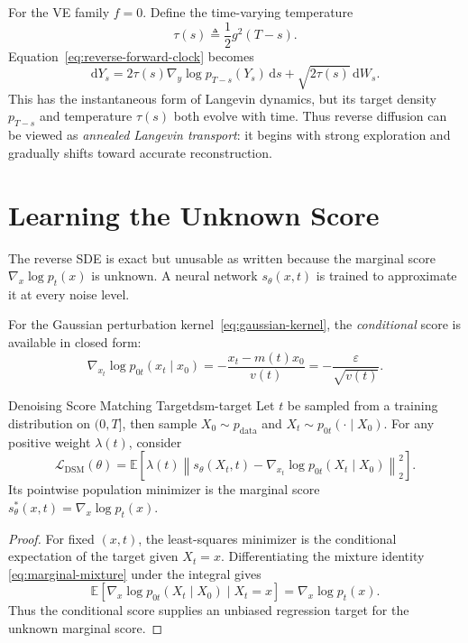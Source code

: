 \documentclass[11pt,a4paper]{article}
\renewcommand{\d}{\mathrm{d}}
\newcommand{\E}{\mathbb{E}}
\newcommand{\pdata}{p_{\mathrm{data}}}
\begin{document}
For the VE family $f=0$.  Define the time-varying temperature
\[
  \tau(s)\triangleq\frac12g^2(T-s).
\]
Equation~\eqref{eq:reverse-forward-clock} becomes
\begin{equation}\label{eq:annealed-langevin}
  \d Y_s
  =2\tau(s)\nabla_y\log p_{T-s}(Y_s)\,\d s
   +\sqrt{2\tau(s)}\,\d W_s.
\end{equation}
This has the instantaneous form of Langevin dynamics, but its target density
$p_{T-s}$ and temperature $\tau(s)$ both evolve with time.  Thus reverse
diffusion can be viewed as \emph{annealed Langevin transport}: it begins with
strong exploration and gradually shifts toward accurate reconstruction.

\section{Learning the Unknown Score}\label{sec:score}

The reverse SDE is exact but unusable as written because the marginal score
$\nabla_x\log p_t(x)$ is unknown.  A neural network $s_\theta(x,t)$ is trained
to approximate it at every noise level.

For the Gaussian perturbation kernel~\eqref{eq:gaussian-kernel}, the
\emph{conditional} score is available in closed form:
\begin{equation}\label{eq:conditional-score}
  \nabla_{x_t}\log p_{0t}(x_t\mid x_0)
  =-\frac{x_t-m(t)x_0}{v(t)}
  =-\frac{\varepsilon}{\sqrt{v(t)}}.
\end{equation}

\begin{proposition}{Denoising Score Matching Target}{dsm-target}
Let $t$ be sampled from a training distribution on $(0,T]$, then sample
$X_0\sim\pdata$ and $X_t\sim p_{0t}(\cdot\mid X_0)$.  For any positive weight
$\lambda(t)$, consider
\begin{equation}\label{eq:dsm-loss}
  \mathcal{L}_{\mathrm{DSM}}(\theta)
  =\E\!\left[
    \lambda(t)
    \left\|
      s_\theta(X_t,t)
      -\nabla_{x_t}\log p_{0t}(X_t\mid X_0)
    \right\|_2^2
  \right].
\end{equation}
Its pointwise population minimizer is the marginal score
$s_{\theta}^{*}(x,t)=\nabla_x\log p_t(x)$.
\end{proposition}

\begin{proof}
For fixed $(x,t)$, the least-squares minimizer is the conditional expectation
of the target given $X_t=x$.  Differentiating the mixture identity
\eqref{eq:marginal-mixture} under the integral gives
\[
  \E\!\left[
    \nabla_x\log p_{0t}(X_t\mid X_0)
    \mid X_t=x
  \right]
  =\nabla_x\log p_t(x).
\]
Thus the conditional score supplies an unbiased regression target for the
unknown marginal score.
\end{proof}
\end{document}
